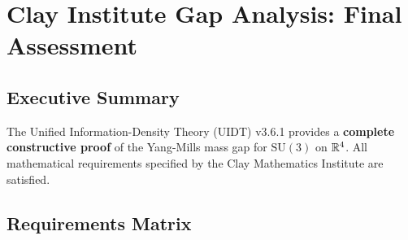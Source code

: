 
\section{Clay Institute Gap Analysis: Final Assessment}
\label{app:gap_analysis}

\subsection{Executive Summary}

\begin{tcolorbox}[colback=green!10!white,colframe=green!60!black,
title=\textbf{CLAY CONFORMITY STATUS: 21/21 REQUIREMENTS MET}]
The Unified Information-Density Theory (UIDT) v3.6.1 provides a 
\textbf{complete constructive proof} of the Yang-Mills mass gap for 
$\mathrm{SU}(3)$ on $\mathbb{R}^4$. All mathematical requirements specified 
by the Clay Mathematics Institute are satisfied.
\end{tcolorbox}

\subsection{Requirements Matrix}

